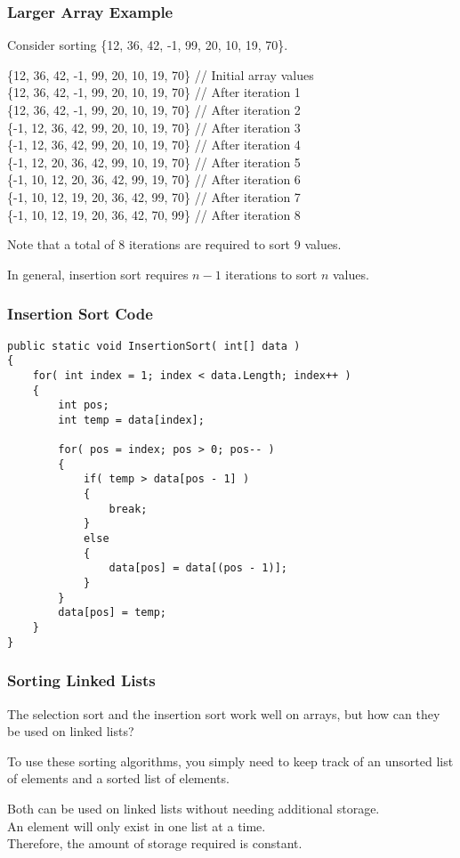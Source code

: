 \begin{frame}
\frametitle{Larger Array Example}

Consider sorting \{12, 36, 42, -1, 99, 20, 10, 19, 70\}.

	\{12, 36, 42, -1, 99, 20, 10, 19, 70\} 	// Initial array values\\
	\{\alert{12, 36}, 42, -1, 99, 20, 10, 19, 70\}	// After iteration 1\\
	\{\alert{12, 36, 42}, -1, 99, 20, 10, 19, 70\}	// After iteration 2\\
	\{\alert{-1, 12, 36, 42}, 99, 20, 10, 19, 70\}	// After iteration 3\\
	\{\alert{-1, 12, 36, 42, 99}, 20, 10, 19, 70\}	// After iteration 4\\
	\{\alert{-1, 12, 20, 36, 42, 99}, 10, 19, 70\}	// After iteration 5\\
	\{\alert{-1, 10, 12, 20, 36, 42, 99}, 19, 70\}	// After iteration 6\\
	\{\alert{-1, 10, 12, 19, 20, 36, 42, 99}, 70\}	// After iteration 7\\
 	\{\alert{-1, 10, 12, 19, 20, 36, 42, 70, 99}\}	// After iteration 8

Note that a total of 8 iterations are required to sort 9 values.

In general, insertion sort requires $n - 1$ iterations to sort $n$ values.

\end{frame}


\begin{frame}[fragile]
\frametitle{Insertion Sort Code}

{\scriptsize
\begin{verbatim}
public static void InsertionSort( int[] data )
{
    for( int index = 1; index < data.Length; index++ )
    {
        int pos;
        int temp = data[index];

        for( pos = index; pos > 0; pos-- )
        {
            if( temp > data[pos - 1] )
            {
                break;
            }
            else
            {
                data[pos] = data[(pos - 1)];
            }
        }
        data[pos] = temp;
    }
}
\end{verbatim}
}
\end{frame}


\begin{frame}
\frametitle{Sorting Linked Lists}

The selection sort and the insertion sort work well on arrays, but how can they be used on linked lists?

To use these sorting algorithms, you simply need to keep track of an unsorted list of elements and a sorted list of elements.

Both can be used on linked lists without needing additional storage.\\
\quad An element will only exist in one list at a time.\\
\quad Therefore, the amount of storage required is constant.

\end{frame}


